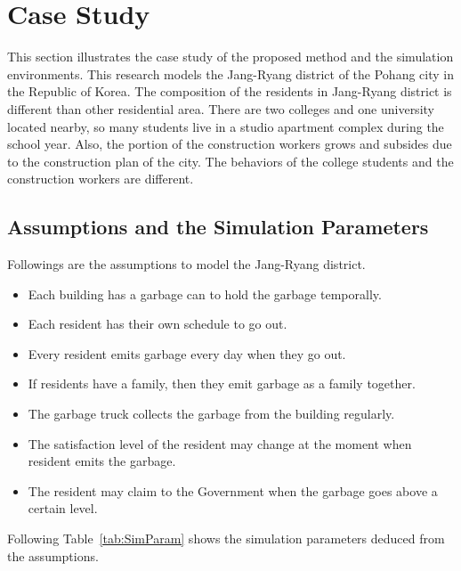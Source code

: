 \documentclass{scsSimAUDPaperFormat}
\begin{document}
\section{Case Study}
This section illustrates the case study of the proposed method and the simulation environments. This research models the Jang-Ryang district of the Pohang city in the Republic of Korea. The composition of the residents in Jang-Ryang district is different than other residential area. There are two colleges and one university located nearby, so many students live in a studio apartment complex during the school year. Also, the portion of the construction workers grows and subsides due to the construction plan of the city. The behaviors of the college students and the construction workers are different. 

\subsection{Assumptions and the Simulation Parameters}
Followings are the assumptions to model the Jang-Ryang district.
\begin{itemize}
    \item Each building has a garbage can to hold the garbage temporally.
    \item Each resident has their own schedule to go out.
    \item Every resident emits garbage every day when they go out. 
    \item If residents have a family, then they emit garbage as a family together.
    \item The garbage truck collects the garbage from the building regularly.
    \item The satisfaction level of the resident may change at the moment when resident emits the garbage.
    \item The resident may claim to the Government when the garbage goes above a certain level.
\end{itemize}

Following Table~\ref{tab:SimParam} shows the simulation parameters deduced from the assumptions.

\end{document}
